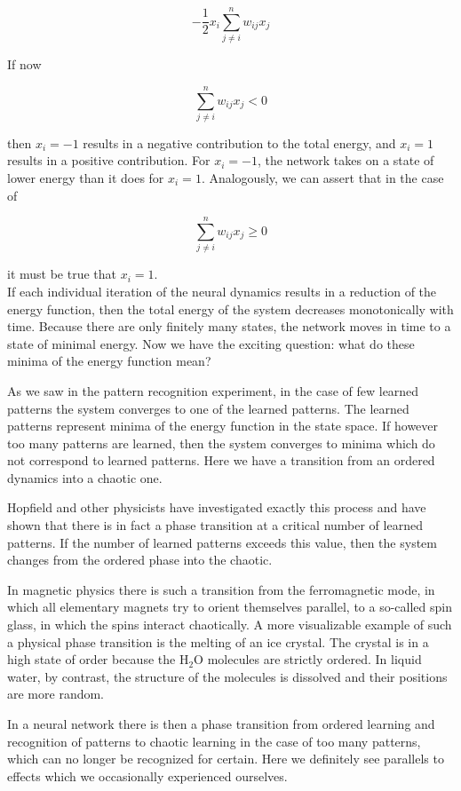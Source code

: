 \documentclass[10pt]{book}
\begin{document}
\begin{center}
\begin{enumerate}
\begin{center}
\begin{center}
\begin{center}
$$
-\frac{1}{2} x_{i} \sum_{j \neq i}^{n} w_{i j} x_{j}
$$

If now

$$
\sum_{j \neq i}^{n} w_{i j} x_{j}<0
$$

then $x_{i}=-1$ results in a negative contribution to the total energy, and $x_{i}=1$ results in a positive contribution. For $x_{i}=-1$, the network takes on a state of lower energy than it does for $x_{i}=1$. Analogously, we can assert that in the case of

$$
\sum_{j \neq i}^{n} w_{i j} x_{j} \geq 0
$$

it must be true that $x_{i}=1$.\\
If each individual iteration of the neural dynamics results in a reduction of the energy function, then the total energy of the system decreases monotonically with time. Because there are only finitely many states, the network moves in time to a state of minimal energy. Now we have the exciting question: what do these minima of the energy function mean?

As we saw in the pattern recognition experiment, in the case of few learned patterns the system converges to one of the learned patterns. The learned patterns represent minima of the energy function in the state space. If however too many patterns are learned, then the system converges to minima which do not correspond to learned patterns. Here we have a transition from an ordered dynamics into a chaotic one.

Hopfield and other physicists have investigated exactly this process and have shown that there is in fact a phase transition at a critical number of learned patterns. If the number of learned patterns exceeds this value, then the system changes from the ordered phase into the chaotic.

In magnetic physics there is such a transition from the ferromagnetic mode, in which all elementary magnets try to orient themselves parallel, to a so-called spin glass, in which the spins interact chaotically. A more visualizable example of such a physical phase transition is the melting of an ice crystal. The crystal is in a high state of order because the $\mathrm{H}_{2} \mathrm{O}$ molecules are strictly ordered. In liquid water, by contrast, the structure of the molecules is dissolved and their positions are more random.

In a neural network there is then a phase transition from ordered learning and recognition of patterns to chaotic learning in the case of too many patterns, which can no longer be recognized for certain. Here we definitely see parallels to effects which we occasionally experienced ourselves.


\end{center}
\end{center}
\end{center}
\end{enumerate}
\end{center}
\end{document}
